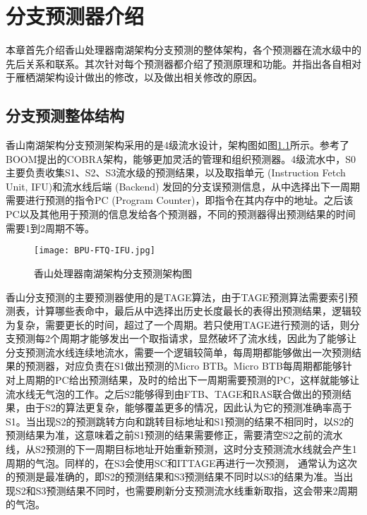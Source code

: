 \chapter{分支预测器介绍}


本章首先介绍香山处理器南湖架构分支预测的整体架构，各个预测器在流水级中的先后关系和联系。其次针对每个预测器都介绍了预测原理和功能。并指出各自相对于雁栖湖架构设计做出的修改，以及做出相关修改的原因。

\section{分支预测整体结构}

香山南湖架构分支预测架构采用的是4级流水设计，架构图如图\ref{fig:figure21}所示。参考了BOOM提出的COBRA架构\cite{cobra}，能够更加灵活的管理和组织预测器。4级流水中，S0主要负责收集S1、S2、S3流水级的预测结果，以及取指单元 (Instruction Fetch Unit, IFU)和流水线后端 (Backend) 发回的分支误预测信息，从中选择出下一周期需要进行预测的指令PC (Program Counter)，即指令在其内存中的地址。之后该PC以及其他用于预测的信息发给各个预测器，不同的预测器得出预测结果的时间需要1到2周期不等。

\begin{figure}[htb]
	\centering
	\setlength\tabcolsep{3pt}  %
	\vspace{5pt} %
	\texttt{[image: BPU-FTQ-IFU.jpg]}
	\caption{香山处理器南湖架构分支预测架构图}
	\label{fig:figure21}
\end{figure}

香山分支预测的主要预测器使用的是TAGE算法\cite{tage, tage-sc-l, new-case-tage}，由于TAGE预测算法需要索引预测表，计算哪些表命中，最后从中选择出历史长度最长的表得出预测结果，逻辑较为复杂，需要更长的时间，超过了一个周期。若只使用TAGE进行预测的话，则分支预测每2个周期才能够发出一个取指请求，显然破坏了流水线，因此为了能够让分支预测流水线连续地流水，需要一个逻辑较简单，每周期都能够做出一次预测结果的预测器，对应负责在S1做出预测的Micro BTB。Micro BTB每周期都能够针对上周期的PC给出预测结果，及时的给出下一周期需要预测的PC，这样就能够让流水线无气泡的工作。之后S2能够得到由FTB、TAGE和RAS联合做出的预测结果，由于S2的算法更复杂，能够覆盖更多的情况，因此认为它的预测准确率高于S1。当出现S2的预测跳转方向和跳转目标地址和S1预测的结果不相同时，以S2的预测结果为准，这意味着之前S1预测的结果需要修正，需要清空S2之前的流水线，从S2预测的下一周期目标地址开始重新预测，这时分支预测流水线就会产生1周期的气泡。同样的，在S3会使用SC和ITTAGE再进行一次预测， 通常认为这次的预测是最准确的，即S2的预测结果和S3预测结果不同时以S3的结果为准。当出现S2和S3预测结果不同时，也需要刷新分支预测流水线重新取指，这会带来2周期的气泡。

